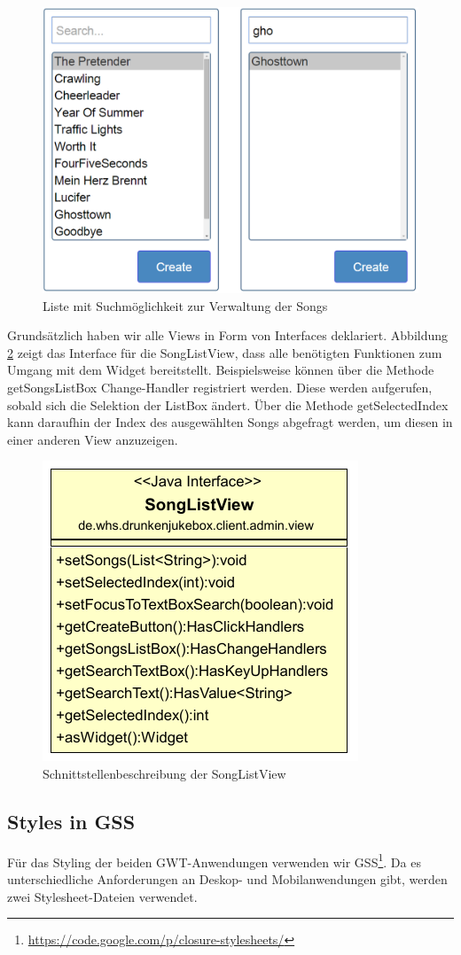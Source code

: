 \begin{figure}[H]
\centering
\includegraphics[width=0.65\linewidth]{Bilder/SongListView}
\caption{Liste mit Suchmöglichkeit zur Verwaltung der Songs}
\label{fig:SongListView}
\end{figure}

Grundsätzlich haben wir alle Views in Form von Interfaces deklariert. Abbildung \ref{fig:SongListViewClass} zeigt das Interface für die SongListView, dass alle benötigten Funktionen zum Umgang mit dem Widget bereitstellt. Beispielsweise können über die Methode getSongsListBox Change-Handler registriert werden. Diese werden aufgerufen, sobald sich die Selektion der ListBox ändert. Über die Methode getSelectedIndex kann daraufhin der Index des ausgewählten Songs abgefragt werden, um diesen in einer anderen View anzuzeigen.

\begin{figure}[H]
\centering
\includegraphics[width=0.4\linewidth]{Bilder/SongListViewClass}
\caption{Schnittstellenbeschreibung der SongListView}
\label{fig:SongListViewClass}
\end{figure}


\subsection{Styles in GSS}
Für das Styling der beiden GWT-Anwendungen verwenden wir GSS\footnote{\url{https://code.google.com/p/closure-stylesheets/}}. Da es unterschiedliche Anforderungen
an Deskop- und Mobilanwendungen gibt, werden zwei Stylesheet-Dateien verwendet.

